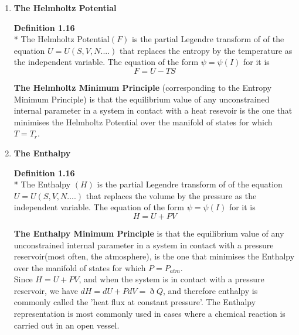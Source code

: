 \documentclass[oneside]{book}
\begin{document}
\begin{enumerate}
    	\setcounter{enumi}{0}
	\item \textbf{The Helmholtz Potential}
		\begin{mdframed}[style=exercise]
\textbf{Definition 1.16}
 \\* The Helmholtz Potential$(F)$ is the partial Legendre transform of of the equation $U = U(S,V,N....)$ that replaces the entropy by the temperature as the independent variable. The equation of the form $\psi = \psi(I)$ for it is 
 \[F = U - TS\]
\end{mdframed}
\textbf{The Helmholtz Minimum Principle} (corresponding to the Entropy Minimum Principle) is that the equilibrium value of any unconstrained internal parameter in a system in contact with a heat resevoir is the one that minimises the Helmholtz Potential over the manifold of states for which $T = T_r$.

	\item \textbf{The Enthalpy}
	\begin{mdframed}[style=exercise]
	\textbf{Definition 1.16}
 \\* The Enthalpy $(H)$ is the partial Legendre transform of of the equation $U = U(S,V,N....)$ that replaces the volume by the pressure as the independent variable. The equation of the form $\psi = \psi(I)$ for it is 
 \[H = U + PV\]
\end{mdframed}
\textbf{The Enthalpy Minimum Principle} is that the equilibrium value of any unconstrained internal parameter in a system in contact with a pressure reservoir(most often, the atmosphere), is the one that minimises the Enthalpy over the manifold of states for which $P = P_{atm}$.\\
Since $ H = U + PV $, and when the system is in contact with a pressure reservoir, we have $dH = dU + PdV = \eth Q$, and therefore enthalpy is commonly called the 'heat flux at constant pressure'. The Enthalpy representation is most commonly used in cases where a chemical reaction is carried out in an open vessel.


\end{enumerate}
\end{document}
